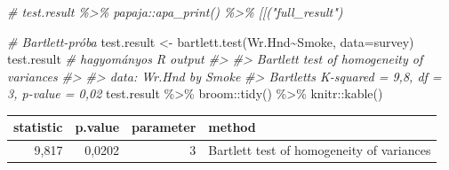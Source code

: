 \documentclass[
]{book}
\newenvironment{Shaded}{\begin{snugshade}}{\end{snugshade}}
\newcommand{\AttributeTok}[1]{\textcolor[rgb]{0.77,0.63,0.00}{#1}}
\newcommand{\CommentTok}[1]{\textcolor[rgb]{0.56,0.35,0.01}{\textit{#1}}}
\newcommand{\FunctionTok}[1]{\textcolor[rgb]{0.00,0.00,0.00}{#1}}
\newcommand{\NormalTok}[1]{#1}
\newcommand{\OtherTok}[1]{\textcolor[rgb]{0.56,0.35,0.01}{#1}}
\newcommand{\SpecialCharTok}[1]{\textcolor[rgb]{0.00,0.00,0.00}{#1}}
\begin{document}
\begin{Shaded}
\begin{Highlighting}[]
\CommentTok{\# test.result \%\textgreater{}\% papaja::apa\_print() \%\textgreater{}\% \textasciigrave{}[[\textasciigrave{}("full\_result")}



\CommentTok{\# Bartlett{-}próba}
\NormalTok{test.result }\OtherTok{\textless{}{-}} \FunctionTok{bartlett.test}\NormalTok{(Wr.Hnd}\SpecialCharTok{\textasciitilde{}}\NormalTok{Smoke, }\AttributeTok{data=}\NormalTok{survey)}
\NormalTok{test.result   }\CommentTok{\# hagyományos R output}
\CommentTok{\#\textgreater{} }
\CommentTok{\#\textgreater{}  Bartlett test of homogeneity of variances}
\CommentTok{\#\textgreater{} }
\CommentTok{\#\textgreater{} data:  Wr.Hnd by Smoke}
\CommentTok{\#\textgreater{} Bartlett\textquotesingle{}s K{-}squared = 9,8, df = 3, p{-}value = 0,02}
\NormalTok{test.result }\SpecialCharTok{\%\textgreater{}\%}\NormalTok{ broom}\SpecialCharTok{::}\FunctionTok{tidy}\NormalTok{() }\SpecialCharTok{\%\textgreater{}\%}\NormalTok{ knitr}\SpecialCharTok{::}\FunctionTok{kable}\NormalTok{()}
\end{Highlighting}
\end{Shaded}

\begin{tabular}{r|r|r|l}
\hline
statistic & p.value & parameter & method\\
\hline
9,817 & 0,0202 & 3 & Bartlett test of homogeneity of variances\\
\hline
\end{tabular}
\end{document}
